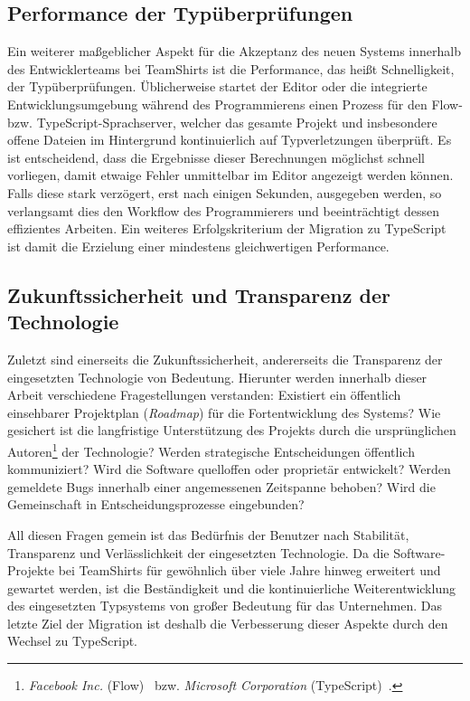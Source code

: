 \subsection{Performance der Typüberprüfungen}

Ein weiterer maßgeblicher Aspekt für die Akzeptanz des neuen Systems innerhalb des Entwicklerteams bei TeamShirts ist die Performance, das heißt Schnelligkeit, der Typüberprüfungen. Üblicherweise startet der Editor oder die integrierte Entwicklungsumgebung während des Programmierens einen Prozess für den Flow- bzw. TypeScript-Sprachserver, welcher das gesamte Projekt und insbesondere offene Dateien im Hintergrund kontinuierlich auf Typverletzungen überprüft. Es ist entscheidend, dass die Ergebnisse dieser Berechnungen möglichst schnell vorliegen, damit etwaige Fehler unmittelbar im Editor angezeigt werden können. Falls diese stark verzögert, erst nach einigen Sekunden, ausgegeben werden, so verlangsamt dies den Workflow des Programmierers und beeinträchtigt dessen effizientes Arbeiten. Ein weiteres Erfolgskriterium der Migration zu TypeScript ist damit die Erzielung einer mindestens gleichwertigen Performance.

\subsection{Zukunftssicherheit und Transparenz der Technologie}

Zuletzt sind einerseits die Zukunftssicherheit, andererseits die Transparenz der eingesetzten Technologie von Bedeutung. Hierunter werden innerhalb dieser Arbeit verschiedene Fragestellungen verstanden: Existiert ein öffentlich einsehbarer Projektplan (\textit{Roadmap}) für die Fortentwicklung des Systems? Wie gesichert ist die langfristige Unterstützung des Projekts durch die ursprünglichen Autoren\footnote{\textit{Facebook Inc.} (Flow)~\autocite{FLOW:PAPER} bzw. \emph{Microsoft Corporation} (TypeScript)~\autocite{TYPESCRIPT:SPEC}.} der Technologie? Werden strategische Entscheidungen öffentlich kommuniziert? Wird die Software quelloffen oder proprietär entwickelt? Werden gemeldete Bugs innerhalb einer angemessenen Zeitspanne behoben? Wird die Gemeinschaft in Entscheidungsprozesse eingebunden?

All diesen Fragen gemein ist das Bedürfnis der Benutzer nach Stabilität, Transparenz und Verlässlichkeit der eingesetzten Technologie. Da die Software-Projekte bei TeamShirts für gewöhnlich über viele Jahre hinweg erweitert und gewartet werden, ist die Beständigkeit und die kontinuierliche Weiterentwicklung des eingesetzten Typsystems von großer Bedeutung für das Unternehmen. Das letzte Ziel der Migration ist deshalb die Verbesserung dieser Aspekte durch den Wechsel zu TypeScript.

